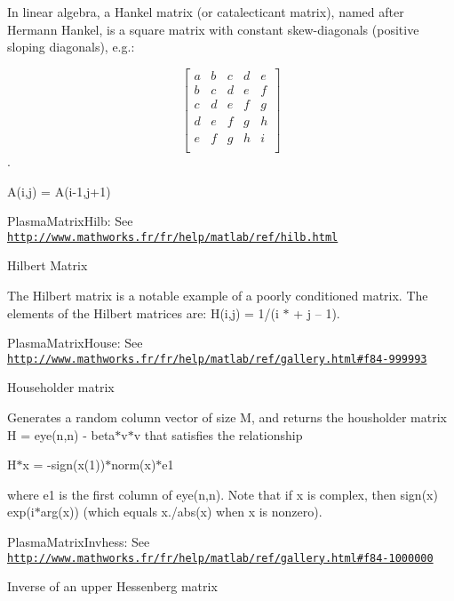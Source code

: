 In linear algebra, a Hankel matrix (or catalecticant matrix), named after Hermann Hankel, is a square matrix with constant skew-\/diagonals (positive sloping diagonals), e.\+g.\+:

\[ \begin{bmatrix} a & b & c & d & e \\ b & c & d & e & f \\ c & d & e & f & g \\ d & e & f & g & h \\ e & f & g & h & i \\ \end{bmatrix} \].

A(i,j) = A(i-\/1,j+1)

\begin{DoxyItemize}
\item Plasma\+Matrix\+Hilb\+: See \href{http://www.mathworks.fr/fr/help/matlab/ref/hilb.html}{\tt http\+://www.\+mathworks.\+fr/fr/help/matlab/ref/hilb.\+html}\end{DoxyItemize}
Hilbert Matrix

The Hilbert matrix is a notable example of a poorly conditioned matrix. The elements of the Hilbert matrices are\+: H(i,j) = 1/(i $\ast$ + j – 1).

\begin{DoxyItemize}
\item Plasma\+Matrix\+House\+: See \href{http://www.mathworks.fr/fr/help/matlab/ref/gallery.html#f84-999993}{\tt http\+://www.\+mathworks.\+fr/fr/help/matlab/ref/gallery.\+html\#f84-\/999993}\end{DoxyItemize}
Householder matrix

Generates a random column vector of size M, and returns the housholder matrix H = eye(n,n) -\/ beta$\ast$v$\ast$v\textquotesingle{} that satisfies the relationship

H$\ast$x = -\/sign(x(1))$\ast$norm(x)$\ast$e1

where e1 is the first column of eye(n,n). Note that if x is complex, then sign(x) exp(i$\ast$arg(x)) (which equals x./abs(x) when x is nonzero).

\begin{DoxyItemize}
\item Plasma\+Matrix\+Invhess\+: See \href{http://www.mathworks.fr/fr/help/matlab/ref/gallery.html#f84-1000000}{\tt http\+://www.\+mathworks.\+fr/fr/help/matlab/ref/gallery.\+html\#f84-\/1000000}\end{DoxyItemize}
Inverse of an upper Hessenberg matrix

